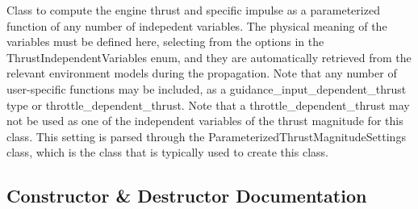 Class to compute the engine thrust and specific impulse as a parameterized function of any number of indepedent variables. The physical meaning of the variables must be defined here, selecting from the options in the Thrust\+Independent\+Variables enum, and they are automatically retrieved from the relevant environment models during the propagation. Note that any number of user-\/specific functions may be included, as a guidance\+\_\+input\+\_\+dependent\+\_\+thrust type or throttle\+\_\+dependent\+\_\+thrust. Note that a throttle\+\_\+dependent\+\_\+thrust may not be used as one of the independent variables of the thrust magnitude for this class. This setting is parsed through the Parameterized\+Thrust\+Magnitude\+Settings class, which is the class that is typically used to create this class. 

\subsection{Constructor \& Destructor Documentation}
